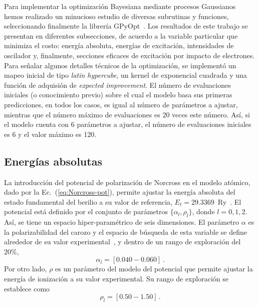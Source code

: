 Para implementar la optimización Bayesiana mediante procesos Gaussianos 
hemos realizado un minucioso estudio de diversas subrutinas y funciones, 
seleccionando finalmente la librería GPyOpt~\cite{GPyOpt}. Los 
resultados de este trabajo se presentan en diferentes subsecciones, de 
acuerdo a la variable particular que minimiza el costo: energía 
absoluta, energías de excitación, intensidades de oscilador y, 
finalmente, secciones eficaces de excitación por impacto de electrones. 
Para señalar algunos detalles técnicos de la optimización, se implementó 
un mapeo inicial de tipo \textit{latin hypercube}, un kernel de 
exponencial cuadrada y una función de adquisión de \textit{expected 
improvement}. El número de evaluaciones iniciales (o conocimiento 
previo) sobre el cual el modelo basa sus primeras predicciones, en todos 
los casos, es igual al número de parámetros a ajustar, mientras que el 
número máximo de evaluaciones es 20 veces este número. Así, si el modelo 
cuenta con 6 parámetros a ajustar, el número de evaluaciones iniciales 
es 6 y el valor máximo es 120.

\subsection{Energías absolutas}

La introducción del potencial de polarización de Norcross en el modelo 
atómico, dado por la Ec.~(\ref{eq:Norcross-pot}), permite ajustar la 
energía absoluta del estado fundamental del berilio a su valor de 
referencia, \mbox{$E_t=29.3369$ Ry}~\cite{NIST}. El potencial está 
definido por el conjunto de parámetros $\{\alpha_l,\rho_l\}$, donde 
$l=0,1,2$. Así, se tiene un espacio hiper-paramétrico de seis 
dimensiones. El parámetro $\alpha$ es la polarizabilidad del carozo y el 
espacio de búsqueda de esta variable se define alrededor de su valor 
experimental~\cite{Dalgarno:62,Sitz:71}, y dentro de un rango de 
exploración del 20\%,
\begin{equation}
\alpha_l=[0.040-0.060]\,.
\end{equation}
Por otro lado, $\rho$ es un parámetro del modelo del potencial que 
permite ajustar la energía de ionización a su valor experimental. Su 
rango de exploración se establece como 
\begin{equation}
\rho_l=[0.50-1.50]\,.
\end{equation}

